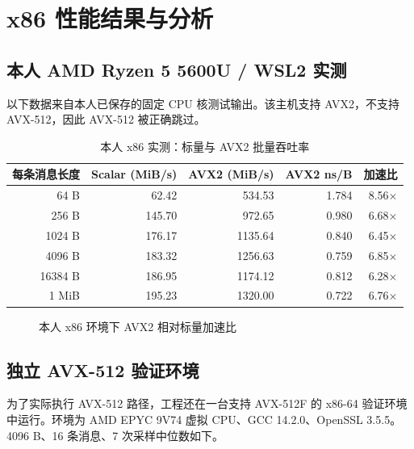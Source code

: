 \documentclass[UTF8,a4paper,12pt]{ctexart}
\begin{document}
\section{x86 性能结果与分析}

\subsection{本人 AMD Ryzen 5 5600U / WSL2 实测}
以下数据来自本人已保存的固定 CPU 核测试输出。该主机支持 AVX2，不支持 AVX-512，因此 AVX-512 被正确跳过。

\begin{table}[H]
\centering
\caption{本人 x86 实测：标量与 AVX2 批量吞吐率}
\begin{tabular}{rrrrr}
\toprule
每条消息长度 & Scalar (MiB/s) & AVX2 (MiB/s) & AVX2 ns/B & 加速比 \\
\midrule
64 B & 62.42 & 534.53 & 1.784 & 8.56$\times$ \\
256 B & 145.70 & 972.65 & 0.980 & 6.68$\times$ \\
1024 B & 176.17 & 1135.64 & 0.840 & 6.45$\times$ \\
4096 B & 183.32 & 1256.63 & 0.759 & 6.85$\times$ \\
16384 B & 186.95 & 1174.12 & 0.812 & 6.28$\times$ \\
1 MiB & 195.23 & 1320.00 & 0.722 & 6.76$\times$ \\
\bottomrule
\end{tabular}
\end{table}

\begin{figure}[H]
\centering
{}
\caption{本人 x86 环境下 AVX2 相对标量加速比}
\end{figure}

\subsection{独立 AVX-512 验证环境}
为了实际执行 AVX-512 路径，工程还在一台支持 AVX-512F 的 x86-64 验证环境中运行。环境为 AMD EPYC 9V74 虚拟 CPU、GCC 14.2.0、OpenSSL 3.5.5。4096 B、16 条消息、7 次采样中位数如下。
\end{document}
